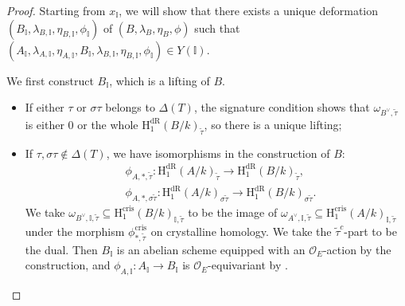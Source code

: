 \documentclass{article}
\begin{document}
\begin{proof}
Starting from $x_{\mathbb{I}}$, we will show that there exists a unique deformation $(B_{\mathbb{I}},\lambda_{B,\mathbb{I}},\eta_{B,\mathbb{I}},\phi_{\mathbb{I}})$ of $(B,\lambda_B,\eta_B,\phi)$ such that $(A_{\mathbb{I}},\lambda_{A,\mathbb{I}},\eta_{A,\mathbb{I}},B_{\mathbb{I}},\lambda_{B,\mathbb{I}},\eta_{B,\mathbb{I}},\phi_{\mathbb{I}})\in Y(\mathbb{I})$.

We first construct $B_{\mathbb{I}}$, which is a lifting of $B$.
\begin{itemize}
	\item If either $\tau$ or $\sigma\tau$ belongs to ${\Delta}(T)$, the signature condition shows that $\omega_{B^\vee,\tilde\tau}$ is either 0 or the whole $\text{H}_1^{\text{dR}}(B/k)_{\tilde\tau}$, so there is a unique lifting;
	\item If $\tau,\sigma\tau\notin\Delta(T)$, we have isomorphisms in the construction of $B$:
\begin{equation}
\begin{aligned}
&\phi_{A,\ast,\tilde\tau}:\text{H}_1^{\text{dR}}(A/k)_{\tilde\tau}\longrightarrow \text{H}^{\text{dR}}_1(B/k)_{\tilde\tau},\\
&\phi_{A,\ast,\sigma\tilde\tau}:\text{H}_1^{\text{dR}}(A/k)_{\sigma\tilde\tau}\longrightarrow \text{H}^{\text{dR}}_1(B/k)_{\sigma\tilde\tau}.
\end{aligned}
\end{equation}
We take $\omega_{B^\vee,\mathbb{I},\tilde\tau}\subseteq \text{H}_1^{\text{cris}}(B/k)_{\mathbb{I},\tilde\tau}$ to be the image of $\omega_{A^\vee,\mathbb{I},\tilde\tau}\subseteq \text{H}_1^{\text{cris}}(A/k)_{\mathbb{I},\tilde\tau}$ under the morphism $\phi^{\text{cris}}_{\ast,\tilde\tau}$ on crystalline homology. We take the $\tilde\tau^c$-part to be the dual. Then $B_{\mathbb{I}}$ is an abelian scheme equipped with an $\mathcal{O}_E$-action by the construction, and $\phi_{A,\mathbb{I}}:A_{\mathbb{I}}\to B_{\mathbb{I}}$ is $\mathcal{O}_E$-equivariant by \citep{Lan}.
\end{itemize}


\end{proof}
\end{document}
